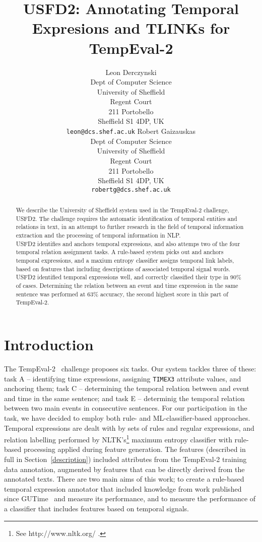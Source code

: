 \documentclass[11pt]{article}
\title{USFD2: Annotating Temporal Expresions and TLINKs for TempEval-2}
\author{Leon Derczynski\\
  Dept of Computer Science\\ 
  University of Sheffield\\ 
  Regent Court\\
  211 Portobello\\ 
  Sheffield S1 4DP, UK\\ 
  {\tt leon@dcs.shef.ac.uk} \And
  Robert Gaizauskas\\
  Dept of Computer Science\\
  University of Sheffield\\
  Regent Court\\
  211 Portobello\\
  Sheffield S1 4DP, UK\\
  {\tt robertg@dcs.shef.ac.uk}
}
\date{}
\begin{document}
\maketitle
\begin{abstract}
We describe the University of Sheffield system used in the TempEval-2 challenge, USFD2. The challenge requires the automatic identification of temporal entities and relations in text, in an attempt to further research in the field of temporal information extraction and the processing of temporal information in NLP.\\USFD2 identifies and anchors temporal expressions, and also attemps two of the four temporal relation assignment tasks. A rule-based system picks out and anchors temporal expressions, and a maxium entropy classifier assigns temporal link labels, based on features that including descriptions of associated temporal signal words. USFD2 identified temporal expressions well, and correctly classified their type in 90\% of cases. Determining the relation between an event and time expression in the same sentence was performed at 63\% accuracy, the second highest score in this part of TempEval-2.
\end{abstract}

\section{Introduction}
The TempEval-2~\cite{pustejovsky2009semeval} challenge proposes six tasks. Our system tackles three of these: task A -- identifying time expressions, assigning {\tt TIMEX3} attribute values, and anchoring them; task C -- determining the temporal relation between and event and time in the same sentence; and task E -- determinig the temporal relation between two main events in consecutive sentences. For our participation in the task, we have decided to employ both rule- and ML-classifier-based approaches. Temporal expressions are dealt with by sets of rules and regular expressions, and relation labelling performed by NLTK's\footnote{See http://www.nltk.org/ .} maximum entropy classifier with rule-based processing applied during feature generation. The features (described in full in Section~\ref{description}) included attributes from the TempEval-2 training data annotation, augmented by features that can be directly derived from the annotated texts. There are two main aims of this work; to create a rule-based temporal expression annotator that included knowledge from work published since GUTime~\cite{mani2000robust} and measure its performance, and to measure the performance of a classifier that includes features based on temporal signals.
\end{document}
